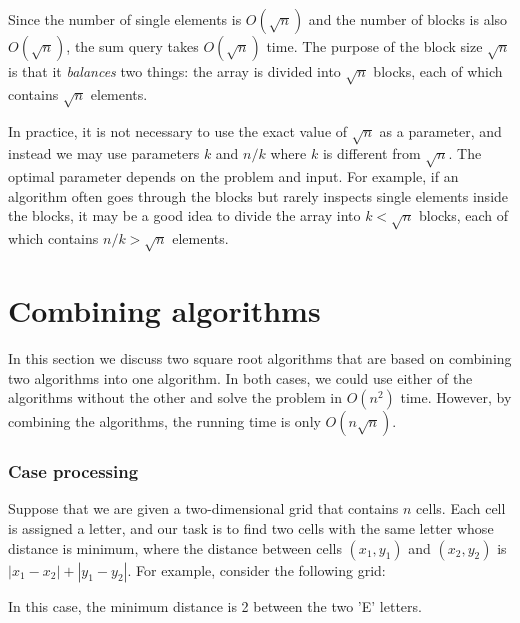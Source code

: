 Since the number of single elements is $O(\sqrt n)$
and the number of blocks is also $O(\sqrt n)$,
the sum query takes $O(\sqrt n)$ time.
The purpose of the block size $\sqrt n$ is
that it \emph{balances} two things:
the array is divided into $\sqrt n$ blocks,
each of which contains $\sqrt n$ elements.

In practice, it is not necessary to use the
exact value of $\sqrt n$ as a parameter,
and instead we may use parameters $k$ and $n/k$ where $k$ is
different from $\sqrt n$.
The optimal parameter depends on the problem and input.
For example, if an algorithm often goes
through the blocks but rarely inspects
single elements inside the blocks,
it may be a good idea to divide the array into
$k < \sqrt n$ blocks, each of which contains $n/k > \sqrt n$
elements.

\section{Combining algorithms}

In this section we discuss two square root algorithms
that are based on combining two algorithms into one algorithm.
In both cases, we could use either of the algorithms
without the other
and solve the problem in $O(n^2)$ time.
However, by combining the algorithms, the running
time is only $O(n \sqrt n)$.

\subsubsection{Case processing}

Suppose that we are given a two-dimensional
grid that contains $n$ cells.
Each cell is assigned a letter,
and our task is to find two cells
with the same letter whose distance is minimum,
where the distance between cells
$(x_1,y_1)$ and $(x_2,y_2)$ is $|x_1-x_2|+|y_1-y_2|$.
For example, consider the following grid:

\begin{center}
\end{center}
In this case, the minimum distance is 2 between the two 'E' letters.

